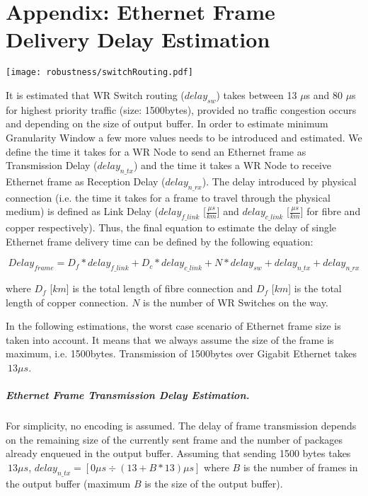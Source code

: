 \chapter{Appendix: Ethernet Frame Delivery Delay Estimation}
\label{appH}

\begin{center}
	\texttt{[image: robustness/switchRouting.pdf]}
	\label{fig:swRouting}
\end{center}

It is estimated that WR Switch routing ($delay_{sw}$) takes between
13 $\mu$s and 80 $\mu$s for highest priority traffic (size: 1500bytes), provided
no traffic congestion occurs and depending on the size of output buffer. In
order to estimate minimum Granularity Window a few more values needs to be
introduced and estimated. We define the time it takes for a WR Node to send an
Ethernet frame as Transmission Delay ($delay_{n\_tx}$) and the time it takes a
WR Node to receive Ethernet frame as Reception Delay ($delay_{n\_rx}$). The
delay introduced by physical connection (i.e. the time it takes for a frame to
travel through the physical medium) is defined as Link Delay ($delay_{f\_link}$
[$\frac{\mu s}{km}$] and $delay_{c\_link}$ [$\frac{\mu s}{km}$] for fibre and
copper respectively). Thus, the final equation to estimate the delay of single
Ethernet frame delivery time can be defined by the following equation:

\begin{equation}
	Delay_{frame} = D_{f} * delay_{f\_link} + D_{c} * delay_{c\_link} + 
	N * delay_{sw} + delay_{n\_tx} + delay_{n\_rx}
\end{equation}	    

where $D_f$ [$km$] is the total length of fibre connection and $D_f$ [$km$] is
the total length of copper connection. $N$ is the number of WR Switches on
the way.

In the following estimations, the worst case scenario of Ethernet frame size is
taken into account. It means that we always assume the size of the frame is
maximum, i.e. 1500bytes. Transmission of 1500bytes over Gigabit Ethernet takes
$~13\mu s$. 


\paragraph{Ethernet Frame Transmission Delay Estimation.} 

For simplicity, no encoding is assumed. The delay of frame transmission depends
on the remaining size of the currently sent frame and the number of packages
already enqueued in the output buffer. Assuming that sending 1500 bytes takes
$~13\mu s$, $delay_{n\_tx}= [ 0 \mu s \div (13 + B * 13)\mu s]$
where $B$ is the number of frames in the output buffer (maximum $B$ is the size
of the output buffer). 

